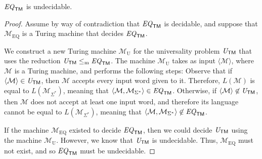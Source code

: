\begin{theorem}\label{thm:EQTMundecidable}
$\mathit{EQ}_{\textsf{TM}}$ is undecidable.

\begin{proof}
Assume by way of contradiction that $\mathit{EQ}_{\textsf{TM}}$ is decidable, and suppose that $\mathcal{M}_{\mathrm{EQ}}$ is a Turing machine that decides $\mathit{EQ}_{\textsf{TM}}$.

We construct a new Turing machine $\mathcal{M}_{\mathrm{U}}$ for the universality problem $\mathit{U}_{\textsf{TM}}$ that uses the reduction $\mathit{U}_{\textsf{TM}} \leq_{\mathrm{m}} \mathit{EQ}_{\textsf{TM}}$. The machine $\mathcal{M}_{\mathrm{U}}$ takes as input $\langle \mathcal{M} \rangle$, where $\mathcal{M}$ is a Turing machine, and performs the following steps:
Observe that if $\langle \mathcal{M} \rangle \in \mathit{U}_{\textsf{TM}}$, then $\mathcal{M}$ accepts every input word given to it. Therefore, $L(\mathcal{M})$ is equal to $L(\mathcal{M}_{\Sigma^{*}})$, meaning that $\langle \mathcal{M}, \mathcal{M}_{\Sigma^{*}} \rangle \in \mathit{EQ}_{\textsf{TM}}$. Otherwise, if $\langle \mathcal{M} \rangle \not\in \mathit{U}_{\textsf{TM}}$, then $\mathcal{M}$ does not accept at least one input word, and therefore its language cannot be equal to $L(\mathcal{M}_{\Sigma^{*}})$, meaning that $\langle \mathcal{M}, \mathcal{M}_{\Sigma^{*}} \rangle \not\in \mathit{EQ}_{\textsf{TM}}$.

If the machine $\mathcal{M}_{\mathrm{EQ}}$ existed to decide $\mathit{EQ}_{\textsf{TM}}$, then we could decide $\mathit{U}_{\textsf{TM}}$ using the machine $\mathcal{M}_{\mathrm{U}}$. However, we know that $\mathit{U}_{\textsf{TM}}$ is undecidable. Thus, $\mathcal{M}_{\mathrm{EQ}}$ must not exist, and so $\mathit{EQ}_{\textsf{TM}}$ must be undecidable.
\end{proof}
\end{theorem}

